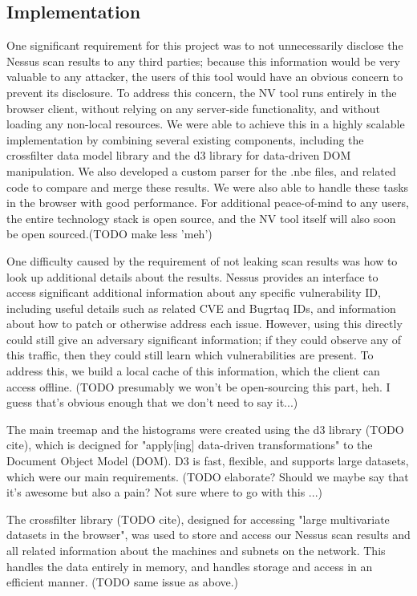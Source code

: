 \documentclass{acm_proc_article-sp}
\begin{document}
\subsection{Implementation}

One significant requirement for this project was to not unnecessarily disclose the Nessus scan results to any third parties; because this information would be very valuable to any attacker, the users of this tool would have an obvious concern to prevent its disclosure.
To address this concern, the NV tool runs entirely in the browser client, without relying on any server-side functionality, and without loading any non-local resources.
We were able to achieve this in a highly scalable implementation by combining several existing components, including the crossfilter data model library and the d3 library for data-driven DOM manipulation.
We also developed a custom parser for the .nbe files, and related code to compare and merge these results.
 We were also able to handle these tasks in the browser with good performance.
For additional peace-of-mind to any users, the entire technology stack is open source, and the NV tool itself will also soon be open sourced.(TODO make less 'meh')

One difficulty caused by the requirement of not leaking scan results was how to look up additional details about the results.
Nessus provides an interface to access significant additional information about any specific vulnerability ID, including useful details such as related CVE and Bugrtaq IDs, and information about how to patch or otherwise address each issue.
However, using this directly could still give an adversary significant information; if they could observe any of this traffic, then they could still learn which vulnerabilities are present.
To address this, we build a local cache of this information, which the client can access offline.
(TODO presumably we won't be open-sourcing this part, heh.
I guess that's obvious enough that we don't need to say it...)

The main treemap and the histograms were created using the d3 library (TODO cite), which is decigned for "apply[ing] data-driven transformations" to the Document Object Model (DOM).
 D3 is fast, flexible, and supports large datasets, which were our main requirements.
(TODO elaborate?  Should we maybe say that it's awesome but also a pain?  Not sure where to go with this ...)

The crossfilter library (TODO cite), designed for accessing "large multivariate datasets in the browser", was used to store and access our Nessus scan results and all related information about the machines and subnets on the network.
 This handles the data entirely in memory, and handles storage and access in an efficient manner.
 (TODO same issue as above.)
\end{document}
